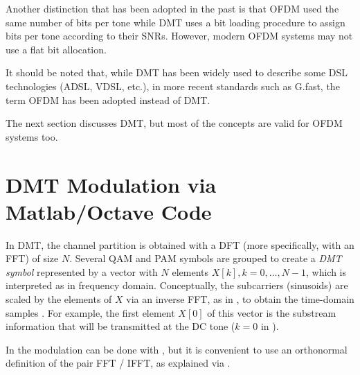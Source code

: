 Another distinction that has been adopted in the past is that OFDM used the same number of bits per tone while DMT uses a bit loading procedure to assign bits per tone according to their SNRs. However, modern OFDM systems may not use a flat bit allocation. 

It should be noted that, while DMT has been widely 
used to describe some DSL technologies (ADSL, VDSL, etc.), in more recent standards such as G.fast,
the term OFDM has been adopted instead of DMT.


The next section discusses DMT, but most of the concepts are valid for OFDM systems too.

\section{DMT Modulation via Matlab/Octave Code}


In DMT, the channel partition is obtained with a DFT (more specifically, with an FFT) of size $N$. 
Several QAM and PAM symbols are grouped to create a \emph{DMT symbol} represented by a vector  with $N$ elements $X[k],k=0,\ldots,N-1$, which is interpreted as in frequency domain. Conceptually, the subcarriers (sinusoids) are scaled by the elements of $X$ via an inverse FFT, as in , to obtain the time-domain samples . 
For example, the first element $X[0]$ of this vector is the substream information that will be transmitted at the DC tone ($k=0$ in ). 

In {{\matlab}} the modulation can be done with , but it is convenient to use an orthonormal definition of the pair FFT / IFFT, as explained via . 

